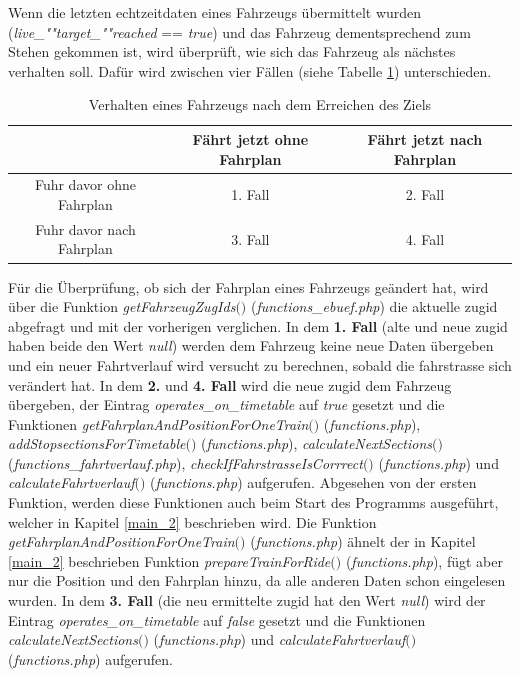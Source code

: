 Wenn die letzten \Gls{echtzeitdaten} eines Fahrzeugs übermittelt wurden (\textit{live\_""target\_""reached} == \textit{true}) und das Fahrzeug dementsprechend zum Stehen gekommen ist, wird überprüft, wie sich das Fahrzeug als nächstes verhalten soll. Dafür wird zwischen vier Fällen (siehe Tabelle \ref{table:vierfaelle}) unterschieden.
\begin{table}
\begin{center}
\renewcommand{\arraystretch}{1.2}
\begin{tabular}{c|c|c}
 & Fährt jetzt ohne Fahrplan & Fährt jetzt nach Fahrplan \\ \hline
Fuhr davor ohne Fahrplan                 		&    1. Fall         & 2. Fall       \\ \hline
Fuhr davor nach Fahrplan                   		&    3. Fall         & 4. Fall       \\ 
\end{tabular}
\renewcommand{\arraystretch}{1}
\caption{Verhalten eines Fahrzeugs nach dem Erreichen des Ziels}
\label{table:vierfaelle}
\end{center}
\end{table}
Für die Überprüfung, ob sich der Fahrplan eines Fahrzeugs geändert hat, wird über die Funktion \textit{getFahrzeugZugIds$($$)$} (\textit{functions\_ebuef.php}) die aktuelle \Gls{zugid} abgefragt und mit der vorherigen verglichen. In dem \textbf{1. Fall} (alte und neue \Gls{zugid} haben beide den Wert \textit{null}) werden dem Fahrzeug keine neue Daten übergeben und ein neuer Fahrtverlauf wird versucht zu berechnen, sobald die \Gls{fahrstrasse} sich verändert hat. In dem \textbf{2.} und \textbf{4. Fall} wird die neue \Gls{zugid} dem Fahrzeug übergeben, der Eintrag \textit{operates\_on\_time\-table} auf \textit{true} gesetzt und die Funktionen \textit{get\-Fahr\-plan\-And\-Po\-sition\-For\-One\-Train$($$)$} (\textit{func\-tions.php}), \textit{add\-Stop\-sections\-For\-Time\-table$($$)$} (\textit{func\-tions.php}), \textit{calculate\-Next\-Sec\-tions$($$)$} (\textit{func\-tions\_fahrtverlauf.php}), \textit{check\-If\-Fahrstrasse\-Is\-Corrrect$($$)$} (\textit{func\-tions.php}) und \textit{calculate\-Fahrt\-ver\-lauf$($$)$} (\textit{func\-tions\-.php}) aufgerufen. Abgesehen von der ersten Funktion, werden diese Funktionen auch beim Start des Programms ausgeführt, welcher in Kapitel \ref{main_2} beschrieben wird. Die Funktion \textit{get\-Fahrplan\-And\-Position\-For\-One\-Train$($$)$} (\textit{func\-tions.php}) ähnelt der in Kapitel \ref{main_2} beschrieben Funktion \textit{pre\-pare\-Train\-For\-Ride$($$)$} (\textit{func\-tions.php}), fügt aber nur die Position und den Fahrplan hinzu, da alle anderen Daten schon eingelesen wurden. In dem \textbf{3. Fall} (die neu ermittelte \Gls{zugid} hat den Wert \textit{null}) wird der Eintrag \textit{operates\_on\_timetable} auf \textit{false} gesetzt und die Funktionen \textit{cal\-cu\-late\-Next\-Sec\-tions$($$)$} (\textit{func\-tions.php}) und \textit{cal\-cu\-late\-Fahrt\-ver\-lauf$($$)$} (\textit{func\-tions.php}) aufgerufen.
